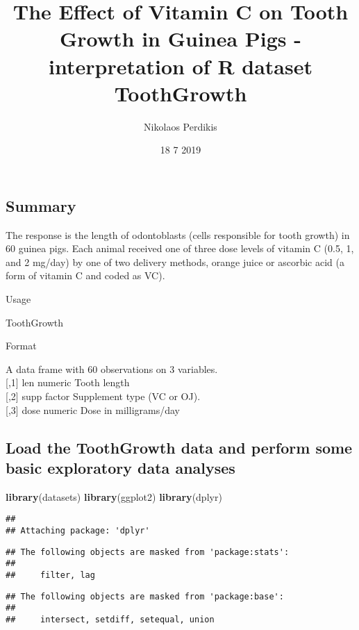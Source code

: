 \documentclass[]{article}
\title{The Effect of Vitamin C on Tooth Growth in Guinea Pigs - interpretation
of R dataset ToothGrowth}
\author{Nikolaos Perdikis}
\date{18 7 2019}
\newenvironment{Shaded}{\begin{snugshade}}{\end{snugshade}}
\newcommand{\KeywordTok}[1]{\textcolor[rgb]{0.13,0.29,0.53}{\textbf{#1}}}
\newcommand{\NormalTok}[1]{#1}
\begin{document}
\maketitle

\hypertarget{summary}{%
\subsection{Summary}\label{summary}}

The response is the length of odontoblasts (cells responsible for tooth
growth) in 60 guinea pigs. Each animal received one of three dose levels
of vitamin C (0.5, 1, and 2 mg/day) by one of two delivery methods,
orange juice or ascorbic acid (a form of vitamin C and coded as VC).

Usage

ToothGrowth

Format

A data frame with 60 observations on 3 variables.\\
{[},1{]} len numeric Tooth length\\
{[},2{]} supp factor Supplement type (VC or OJ).\\
{[},3{]} dose numeric Dose in milligrams/day

\hypertarget{load-the-toothgrowth-data-and-perform-some-basic-exploratory-data-analyses}{%
\subsection{Load the ToothGrowth data and perform some basic exploratory
data
analyses}\label{load-the-toothgrowth-data-and-perform-some-basic-exploratory-data-analyses}}

\begin{Shaded}
\begin{Highlighting}[]
\KeywordTok{library}\NormalTok{(datasets)}
\KeywordTok{library}\NormalTok{(ggplot2)}
\KeywordTok{library}\NormalTok{(dplyr)}
\end{Highlighting}
\end{Shaded}

\begin{verbatim}
## 
## Attaching package: 'dplyr'
\end{verbatim}

\begin{verbatim}
## The following objects are masked from 'package:stats':
## 
##     filter, lag
\end{verbatim}

\begin{verbatim}
## The following objects are masked from 'package:base':
## 
##     intersect, setdiff, setequal, union
\end{verbatim}
\end{document}
